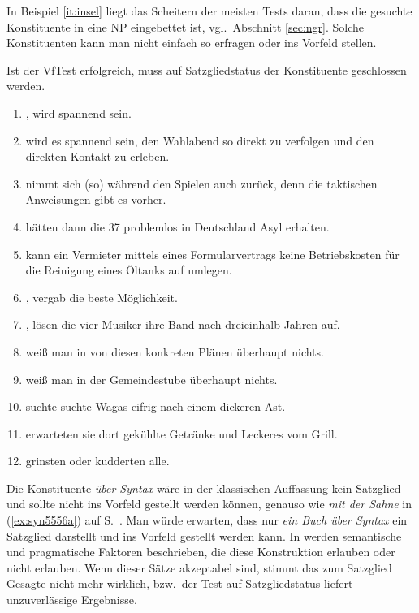 In Beispiel \ref{it:insel} liegt das Scheitern der meisten Tests daran, dass die gesuchte Konstituente in eine NP eingebettet ist, vgl.\ Abschnitt \ref{sec:ngr}.
Solche Konstituenten kann man nicht einfach so erfragen oder ins Vorfeld stellen.


Ist der VfTest erfolgreich, muss auf Satzgliedstatus der Konstituente geschlossen werden.

\begin{enumerate}\Lf
  \item {}, wird spannend sein.
  \item \VfTest {} wird es spannend sein, den Wahlabend so direkt zu verfolgen und den direkten Kontakt zu erleben.
  \item \VfTest [Er] nimmt sich (so) während den Spielen auch zurück, denn die taktischen Anweisungen gibt es vorher.
  \item {} hätten dann die 37 problemlos in Deutschland Asyl erhalten.
  \item \VfTest {} kann ein Vermieter mittels eines Formularvertrags keine Betriebskosten für die Reinigung eines Öltanks auf umlegen.
  \item {}, vergab die beste Möglichkeit.
  \item {}, lösen die vier Musiker ihre Band nach dreieinhalb Jahren auf.
  \item \VfTest {} weiß man in von diesen konkreten Plänen überhaupt nichts.
  \item {} weiß man in der Gemeindestube überhaupt nichts.
  \item \VfTest [Um zu helfen] suchte suchte Wagas eifrig nach einem dickeren Ast.
  \item {} erwarteten sie dort gekühlte Getränke und Leckeres vom Grill.
  \item {} grinsten oder kudderten alle.
\end{enumerate}


Die Konstituente \textit{über Syntax} wäre in der klassischen Auffassung kein Satzglied und sollte nicht ins Vorfeld gestellt werden können, genauso wie \textit{mit der Sahne} in (\ref{ex:syn5556a}) auf S.\ \pageref{ex:syn5556a}.
Man würde erwarten, dass nur \textit{ein Buch über Syntax} ein Satzglied darstellt und ins Vorfeld gestellt werden kann.
In \citet{Dekuthy2002} werden semantische und pragmatische Faktoren beschrieben, die diese Konstruktion erlauben oder nicht erlauben.
Wenn dieser Sätze akzeptabel sind, stimmt das zum Satzglied Gesagte nicht mehr wirklich, bzw.\ der Test auf Satzgliedstatus liefert unzuverlässige Ergebnisse.

